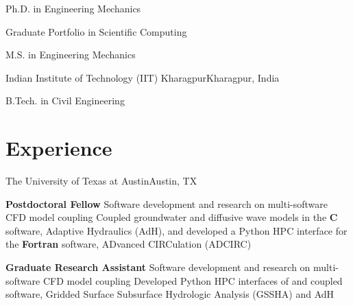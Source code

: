 \documentclass[letterpaper,10pt]{article}
\begin{document}
      \resumeSubSubheading
        {Ph.D. in Engineering Mechanics}{}

      \resumeSubSubheading
        {Graduate Portfolio in Scientific Computing}{}

      \resumeSubSubheading
        {M.S. in Engineering Mechanics}{}

    \resumeSubheading
      {Indian Institute of Technology (IIT) Kharagpur}{Kharagpur, India}

      \resumeSubSubheading
        {B.Tech. in Civil Engineering}{}

  \resumeSubHeadingListEnd

\section{Experience}
  \resumeSubHeadingListStart

    \resumeSubheading
      {The University of Texas at Austin}{Austin, TX}

      \resumeSubSubheading
        {\textbf{Postdoctoral Fellow}}{}
        \resumeItemListStart
            {Software development and research on multi-software CFD model
            coupling}
            {Coupled groundwater and diffusive wave models in the \textbf{C}
            software, Adaptive Hydraulics (AdH), and developed a Python HPC
            interface for the \textbf{Fortran} software, ADvanced CIRCulation
            (ADCIRC)}
        \resumeItemListEnd

      \resumeSubSubheading
       {\textbf{Graduate Research Assistant}}{}
       \resumeItemListStart
            {Software development and research on multi-software CFD model
            coupling}
            {Developed Python HPC interfaces of and coupled \textbf{\CC{}}
            software, Gridded Surface Subsurface Hydrologic Analysis (GSSHA) and
            AdH}
       \resumeItemListEnd
\end{document}
